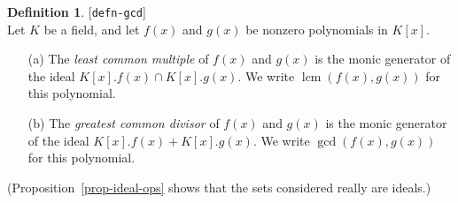 \documentclass{amsart}
\newcommand{\lbl}[1]{\label{#1}\textup{[\texttt{#1}]}\ \\}
\newcommand{\lbl}{\label}
\newcommand{\lcm}	{\operatorname{lcm}}
\renewcommand{\:}{\colon}
\theoremstyle{definition}
\newtheorem{definition}[theorem]{Definition}
\begin{document}
\begin{definition}\lbl{defn-gcd}
 Let $K$ be a field, and let $f(x)$ and $g(x)$ be nonzero polynomials
 in $K[x]$.
 \begin{itemize}
  \item[(a)] The \emph{least common multiple} of $f(x)$ and $g(x)$ is
   the monic generator of the ideal $K[x].f(x)\cap K[x].g(x)$.  We
   write $\lcm(f(x),g(x))$ for this polynomial.
  \item[(b)] The \emph{greatest common divisor} of $f(x)$ and $g(x)$
   is the monic generator of the ideal $K[x].f(x)+K[x].g(x)$.  We
   write $\gcd(f(x),g(x))$ for this polynomial.
 \end{itemize}
 (Proposition~\ref{prop-ideal-ops} shows that the sets considered
 really are ideals.)
\end{definition}
\end{document}

